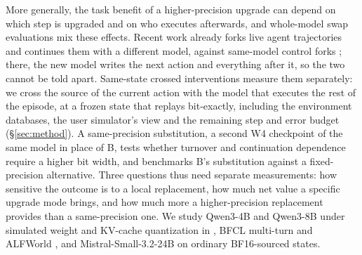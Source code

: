 More generally, the task benefit of a higher-precision upgrade can depend on which step is upgraded and on who executes afterwards, and whole-model swap evaluations mix these effects. Recent work already forks live agent trajectories and continues them with a different model, against same-model control forks \citep{gonuguntla2026replay}; there, the new model writes the next action and everything after it, so the two cannot be told apart. Same-state crossed interventions measure them separately: we cross the source of the current action with the model that executes the rest of the episode, at a frozen state that replays bit-exactly, including the environment databases, the user simulator's view and the remaining step and error budget (\S\ref{sec:method}). A same-precision substitution, a second W4 checkpoint of the same model in place of B, tests whether turnover and continuation dependence require a higher bit width, and benchmarks B's substitution against a fixed-precision alternative. Three questions thus need separate measurements: how sensitive the outcome is to a local replacement, how much net value a specific upgrade mode brings, and how much more a higher-precision replacement provides than a same-precision one. We study Qwen3-4B and Qwen3-8B \citep{yang2025qwen3} under simulated weight and KV-cache quantization in \tautwo{} \citep{yao2024tau,barres2025tau2}, BFCL multi-turn \citep{patil2025bfcl} and ALFWorld \citep{shridhar2021alfworld}, and Mistral-Small-3.2-24B \citep{mistral2025small32} on ordinary BF16-sourced \tautwo{} states. %

